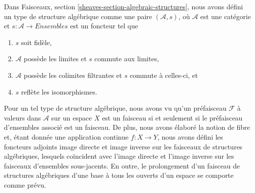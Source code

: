 \noindent
Dans Faisceaux, section \ref{sheaves-section-algebraic-structures},
nous avons défini un type de structure algébrique comme une paire
$(\mathcal{A}, s)$, où $\mathcal{A}$ est une catégorie
et $s : \mathcal{A} \to \textit{Ensembles}$ est un foncteur tel
que
\begin{enumerate}
\item $s$ soit fidèle,
\item $\mathcal{A}$ possède les limites et $s$ commute aux limites,
\item $\mathcal{A}$ possède les colimites filtrantes et $s$ commute à celles-ci, et
\item $s$ reflète les isomorphismes.
\end{enumerate}
Pour un tel type de structure algébrique, nous avons vu qu'un préfaisceau
$\mathcal{F}$ à valeurs dans $\mathcal{A}$ sur un espace $X$ est un faisceau si et
seulement si le préfaisceau d'ensembles associé est un faisceau. De plus,
nous avons élaboré la notion de fibre et, étant donnée une application continue
$f : X \to Y$, nous avons défini les foncteurs adjoints image directe et image inverse
sur les faisceaux de structures algébriques, lesquels coïncident avec l'image directe
et l'image inverse sur les faisceaux d'ensembles sous-jacents. En outre, le prolongement
d'un faisceau de structures algébriques d'une base à tous les ouverts
d'un espace se comporte comme prévu.


